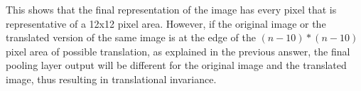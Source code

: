 \documentclass[parskip=half]{scrartcl}
\begin{document}
        This shows that the final representation of the image has every pixel that is representative of a 12x12 pixel area. However, if the original image or the translated version of the same image is at the edge of the $(n-10)*(n-10)$ pixel area of possible translation, as explained in the previous answer, the final pooling layer output will be different for the original image and the translated image, thus resulting in translational invariance.



\end{document}
